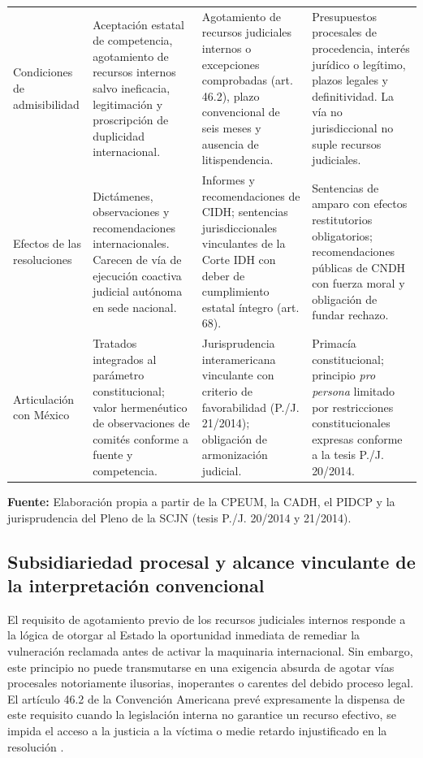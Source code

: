 \documentclass[12pt,spanish,letterpaper,oneside]{article}
\begin{document}
\begin{landscape}
\begin{tabularx}{0.96\linewidth}{>{\bfseries\raggedright\arraybackslash}p{2.6cm} *{3}{>{\raggedright\arraybackslash}X}}
\addlinespace
Condiciones de admisibilidad & Aceptaci\'on estatal de competencia, agotamiento de recursos internos salvo ineficacia, legitimaci\'on y proscripci\'on de duplicidad internacional. & Agotamiento de recursos judiciales internos o excepciones comprobadas (art. 46.2), plazo convencional de seis meses y ausencia de litispendencia. & Presupuestos procesales de procedencia, inter\'es jur\'idico o leg\'itimo, plazos legales y definitividad. La v\'ia no jurisdiccional no suple recursos judiciales. \\
\addlinespace
Efectos de las resoluciones & Dict\'amenes, observaciones y recomendaciones internacionales. Carecen de v\'ia de ejecuci\'on coactiva judicial aut\'onoma en sede nacional. & Informes y recomendaciones de CIDH; sentencias jurisdiccionales vinculantes de la Corte IDH con deber de cumplimiento estatal \'integro (art. 68). & Sentencias de amparo con efectos restitutorios obligatorios; recomendaciones p\'ublicas de CNDH con fuerza moral y obligaci\'on de fundar rechazo. \\
\addlinespace
Articulaci\'on con M\'exico & Tratados integrados al par\'ametro constitucional; valor hermen\'eutico de observaciones de comit\'es conforme a fuente y competencia. & Jurisprudencia interamericana vinculante con criterio de favorabilidad (P./J. 21/2014); obligaci\'on de armonizaci\'on judicial. & Primac\'ia constitucional; principio \emph{pro persona} limitado por restricciones constitucionales expresas conforme a la tesis P./J. 20/2014. \\
\bottomrule
\end{tabularx}
\endgroup
\par\vspace{6pt}
{\footnotesize\raggedright\textbf{Fuente:} Elaboraci\'on propia a partir de la CPEUM, la CADH, el PIDCP y la jurisprudencia del Pleno de la SCJN (tesis P./J. 20/2014 y 21/2014).\par}

\end{landscape}
\clearpage
\pagestyle{fancy}

\subsection{Subsidiariedad procesal y alcance vinculante de la interpretaci\'on convencional}

El requisito de agotamiento previo de los recursos judiciales internos responde a la l\'ogica de otorgar al Estado la oportunidad inmediata de remediar la vulneraci\'on reclamada antes de activar la maquinaria internacional. Sin embargo, este principio no puede transmutarse en una exigencia absurda de agotar v\'ias procesales notoriamente ilusorias, inoperantes o carentes del debido proceso legal. El art\'iculo 46.2 de la Convenci\'on Americana prev\'e expresamente la dispensa de este requisito cuando la legislaci\'on interna no garantice un recurso efectivo, se impida el acceso a la justicia a la v\'ictima o medie retardo injustificado en la resoluci\'on \citep{oeaPacto1969ADH}.
\end{document}
